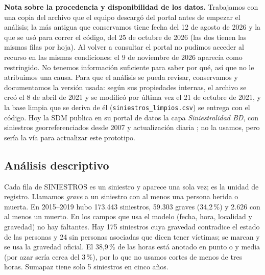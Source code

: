\documentclass[10pt,twocolumn]{article}
\begin{document}
\textbf{Nota sobre la procedencia y disponibilidad de los datos.} Trabajamos con una copia del archivo que el equipo descargó del portal antes de empezar el análisis; la más antigua que conservamos tiene fecha del 12 de agosto de 2026 y la que se usó para correr el código, del 25 de octubre de 2026 (las dos tienen las mismas filas por hoja). Al volver a consultar el portal no pudimos acceder al recurso en las mismas condiciones: el 9 de noviembre de 2026 aparecía como restringido. No tenemos información suficiente para saber por qué, así que no le atribuimos una causa. Para que el análisis se pueda revisar, conservamos y documentamos la versión usada: según sus propiedades internas, el archivo se creó el 8 de abril de 2021 y se modificó por última vez el 21 de octubre de 2021, y la base limpia que se deriva de él (\texttt{siniestros\_limpios.csv}) se entrega con el código. Hoy la SDM publica en su portal de datos la capa \emph{Siniestralidad BD}, con siniestros georreferenciados desde 2007 y actualización diaria \citep{sdmsigat}; no la usamos, pero sería la vía para actualizar este prototipo.

\subsection{Análisis descriptivo}
Cada fila de SINIESTROS es un siniestro y aparece una sola vez; es la unidad de registro. Llamamos \emph{grave} a un siniestro con al menos una persona herida o muerta. En 2015--2019 hubo 173.443 siniestros, 59.303 graves (34,2\,\%) y 2.626 con al menos un muerto. En los campos que usa el modelo (fecha, hora, localidad y gravedad) no hay faltantes. Hay 175 siniestros cuya gravedad contradice el estado de las personas y 24 sin personas asociadas que dicen tener víctimas; se marcan y se usa la gravedad oficial. El 38,9\,\% de las horas está anotado en punto o y media (por azar sería cerca del 3\,\%), por lo que no usamos cortes de menos de tres horas. Sumapaz tiene solo 5 siniestros en cinco años.
\end{document}
